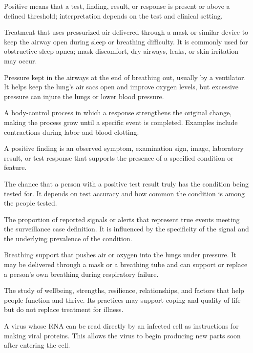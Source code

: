  Positive means that a test, finding, result, or response is present or above a defined threshold; interpretation depends on the test and clinical setting.

 Treatment that uses pressurized air delivered through a mask or similar device to keep the airway open during sleep or breathing difficulty. It is commonly used for obstructive sleep apnea; mask discomfort, dry airways, leaks, or skin irritation may occur.

 Pressure kept in the airways at the end of breathing out, usually by a ventilator. It helps keep the lung’s air sacs open and improve oxygen levels, but excessive pressure can injure the lungs or lower blood pressure.

 A body-control process in which a response strengthens the original change, making the process grow until a specific event is completed. Examples include contractions during labor and blood clotting.

 A positive finding is an observed symptom, examination sign, image, laboratory result, or test response that supports the presence of a specified condition or feature.

 The chance that a person with a positive test result truly has the condition being tested for. It depends on test accuracy and how common the condition is among the people tested.

 The proportion of reported signals or alerts that represent true events meeting the
surveillance case definition. It is influenced by the specificity of the signal and the
underlying prevalence of the condition.

 Breathing support that pushes air or oxygen into the lungs under pressure. It may be delivered through a mask or a breathing tube and can support or replace a person’s own breathing during respiratory failure.

 The study of wellbeing, strengths, resilience, relationships, and factors that help people function and thrive. Its practices may support coping and quality of life but do not replace treatment for illness.

 A virus whose RNA can be read directly by an infected cell as instructions for making viral proteins. This allows the virus to begin producing new parts soon after entering the cell.

